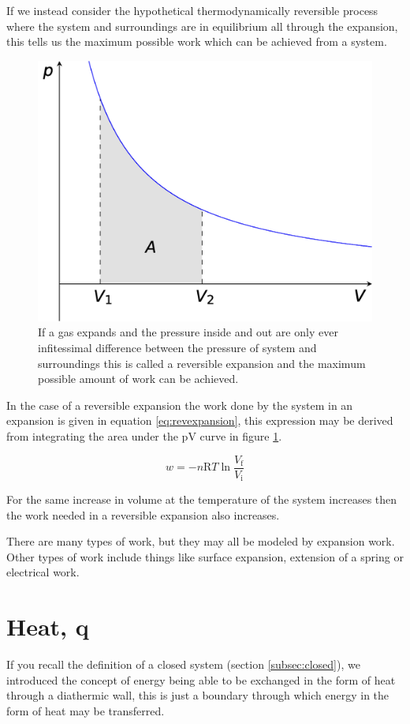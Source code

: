 \documentclass[
]{book}
\begin{document}
If we instead consider the hypothetical thermodynamically reversible process where the system and surroundings are in equilibrium all through the expansion, this tells us the maximum possible work which can be achieved from a system.

\begin{figure}

{\centering \includegraphics[width=0.5\linewidth]{images/revexpansion} 

}

\caption{If a gas expands and the pressure inside and out are only ever infitessimal difference between the pressure of system and surroundings this is called a reversible expansion and the maximum possible amount of work can be achieved.}\label{fig:revexpansion}
\end{figure}

In the case of a reversible expansion the work done by the system in an expansion is given in equation \eqref{eq:revexpansion}, this expression may be derived from integrating the area under the pV curve in figure \ref{fig:revexpansion}.

\begin{equation}
w=-n\textrm{R}T \ln {\frac{V_\textrm{f}}{V_\textrm{i}}}
\label{eq:revexpansion}
\end{equation}

For the same increase in volume at the temperature of the system increases then the work needed in a reversible expansion also increases.

There are many types of work, but they may all be modeled by expansion work. Other types of work include things like surface expansion, extension of a spring or electrical work.

\hypertarget{sec:heat}{%
\section{Heat, q}\label{sec:heat}}

If you recall the definition of a closed system (section \ref{subsec:closed}), we introduced the concept of energy being able to be exchanged in the form of heat through a diathermic wall, this is just a boundary through which energy in the form of heat may be transferred.
\end{document}
